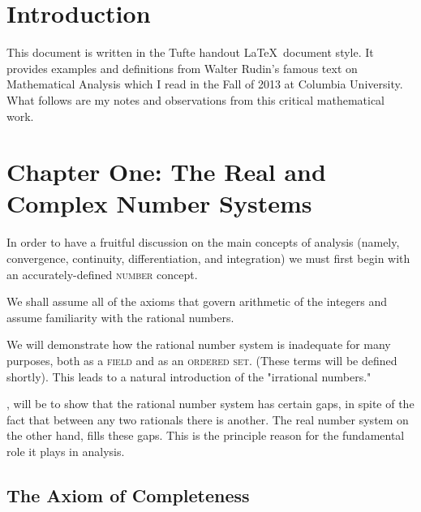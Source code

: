 \documentclass{tufte-book}
\theoremstyle{definition}
\numberwithin{section}{chapter}
\begin{document}
\chapter*{Introduction}
\noindent This document is written in the Tufte handout \LaTeX\ document style.
It provides examples and definitions from Walter Rudin's famous text on Mathematical Analysis which I read in the Fall of 2013 at Columbia University.  What follows are my notes and observations from this critical mathematical work.




\chapter{Chapter One: The Real and Complex Number Systems}\label{sec:page-layout}

In order to have a fruitful discussion on the main concepts of analysis (namely, convergence, continuity, differentiation, and integration) we must first begin with an accurately-defined \textsc{number} concept.

We shall assume all of the axioms that govern arithmetic of the integers and assume familiarity with the rational numbers.  

We will demonstrate how the rational number system is inadequate for many purposes, both as a \textsc{field} and as an \textsc{ordered set}.   (These terms will be defined shortly).   This leads to a natural introduction of the "irrational numbers."

, will be to show that the rational number system has certain gaps, in spite of the fact that between any two rationals there is another.   The real number system on the other hand, fills these gaps.  This is the principle reason for the fundamental role it plays in analysis. 

\bigskip

\section{The Axiom of Completeness}
\end{document}
